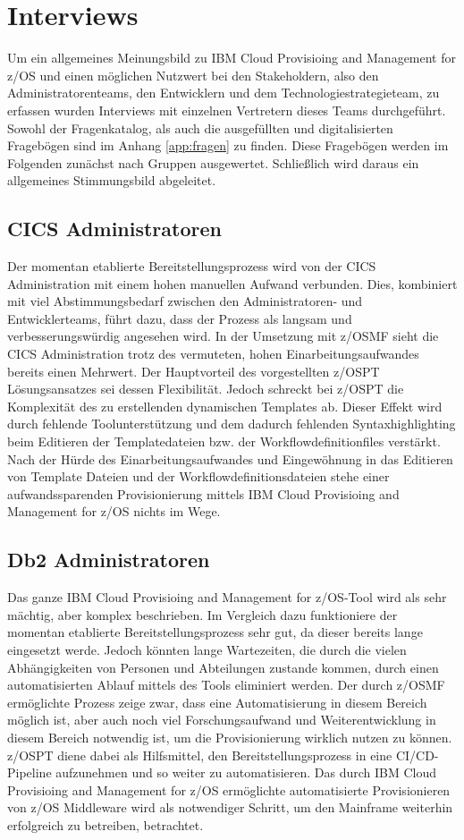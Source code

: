 \section{Interviews}
Um ein allgemeines Meinungsbild zu \glqq IBM Cloud Provisioing and Management for z/OS\grqq{} und einen möglichen Nutzwert bei den Stakeholdern, also den Administratorenteams, den Entwicklern und dem Technologiestrategieteam, zu erfassen wurden Interviews mit einzelnen Vertretern dieses Teams durchgeführt.
Sowohl der Fragenkatalog, als auch die ausgefüllten und digitalisierten Fragebögen sind im Anhang \ref{app:fragen} zu finden.
Diese Fragebögen werden im Folgenden zunächst nach Gruppen ausgewertet.
Schließlich wird daraus ein allgemeines Stimmungsbild abgeleitet.

\subsection{CICS Administratoren}
Der momentan etablierte Bereitstellungsprozess wird von der CICS Administration mit einem hohen manuellen Aufwand verbunden.
Dies, kombiniert mit viel Abstimmungsbedarf zwischen den Administratoren- und Entwicklerteams, führt dazu, dass der Prozess als langsam und verbesserungswürdig angesehen wird.
In der Umsetzung mit z/OSMF sieht die CICS Administration trotz des vermuteten, hohen Einarbeitungsaufwandes bereits einen Mehrwert.
Der Hauptvorteil des vorgestellten z/OSPT Lösungsansatzes sei dessen Flexibilität.
Jedoch schreckt bei z/OSPT die Komplexität des zu erstellenden dynamischen Templates ab.
Dieser Effekt wird durch fehlende Toolunterstützung und dem dadurch fehlenden Syntaxhighlighting beim Editieren der Templatedateien bzw. der Workflowdefinitionfiles verstärkt.
Nach der Hürde des Einarbeitungsaufwandes und Eingewöhnung in das Editieren von Template Dateien und der Workflowdefinitionsdateien stehe einer aufwandssparenden Provisionierung mittels \glqq IBM Cloud Provisioing and Management for z/OS\grqq{} nichts im Wege.

\subsection{Db2 Administratoren}
Das ganze \glqq IBM Cloud Provisioing and Management for z/OS\grqq-Tool wird als sehr mächtig, aber komplex beschrieben.
Im Vergleich dazu funktioniere der momentan etablierte Bereitstellungsprozess sehr gut, da dieser bereits lange eingesetzt werde.
Jedoch könnten lange Wartezeiten, die durch die vielen Abhängigkeiten von Personen und Abteilungen zustande kommen, durch einen automatisierten Ablauf mittels des Tools eliminiert werden.
Der durch z/OSMF ermöglichte Prozess zeige zwar, dass eine Automatisierung in diesem Bereich möglich ist, aber auch noch viel Forschungsaufwand und Weiterentwicklung in diesem Bereich notwendig ist, um die Provisionierung wirklich nutzen zu können.
z/OSPT diene dabei als Hilfsmittel, den Bereitstellungsprozess in eine CI/CD-Pipeline aufzunehmen und so weiter zu automatisieren.
Das durch \glqq IBM Cloud Provisioing and Management for z/OS\grqq{} ermöglichte automatisierte Provisionieren von z/OS Middleware wird als notwendiger Schritt, um den Mainframe weiterhin erfolgreich zu betreiben, betrachtet.

